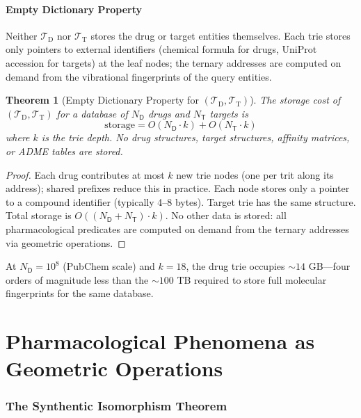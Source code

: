 \documentclass[11pt,twocolumn,a4paper]{article}
\newtheorem{theorem}{Theorem}[section]
\theoremstyle{definition}
\theoremstyle{remark}
\newcommand{\Trie}{\mathcal{T}}
\newcommand{\Dtrie}{\Trie_{\mathrm{D}}}
\newcommand{\Ttrie}{\Trie_{\mathrm{T}}}
\newcommand{\Drug}{\mathsf{D}}
\newcommand{\Target}{\mathsf{T}}
\begin{document}
\subsection{Empty Dictionary Property}

Neither $\Dtrie$ nor $\Ttrie$ stores the drug or target entities themselves. Each trie stores only pointers to external identifiers (chemical formula for drugs, UniProt accession for targets) at the leaf nodes; the ternary addresses are computed on demand from the vibrational fingerprints of the query entities.

\begin{theorem}[Empty Dictionary Property for $(\Dtrie, \Ttrie)$]
\label{thm:empty_dict}
The storage cost of $(\Dtrie, \Ttrie)$ for a database of $N_\Drug$ drugs and $N_\Target$ targets is
\begin{equation}
\mathrm{storage} = O(N_\Drug \cdot k) + O(N_\Target \cdot k)
\end{equation}
where $k$ is the trie depth. No drug structures, target structures, affinity matrices, or ADME tables are stored.
\end{theorem}

\begin{proof}
Each drug contributes at most $k$ new trie nodes (one per trit along its address); shared prefixes reduce this in practice. Each node stores only a pointer to a compound identifier (typically 4--8 bytes). Target trie has the same structure. Total storage is $O((N_\Drug + N_\Target) \cdot k)$. No other data is stored: all pharmacological predicates are computed on demand from the ternary addresses via geometric operations.
\end{proof}

At $N_\Drug = 10^8$ (PubChem scale) and $k = 18$, the drug trie occupies $\sim\!14$ GB---four orders of magnitude less than the $\sim\!100$ TB required to store full molecular fingerprints for the same database.

\part{Pharmacological Phenomena as Geometric Operations}

\section{The Synthentic Isomorphism Theorem}
\label{sec:synthentic_iso}
\end{document}
